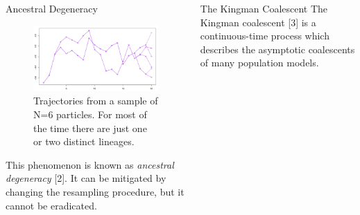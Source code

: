 \documentclass[final, 12pt]{beamer}
\newlength{\colwidth}
\begin{document}
\begin{frame}
\begin{columns}
\begin{column}{\colwidth}
\begin{block}{Ancestral Degeneracy}
\begin{figure} %
\includegraphics[width=0.9\colwidth]{degeneracy.pdf}
\caption{Trajectories from a sample of N=6 particles. For most of the time there are just one or two distinct lineages.}
\end{figure}

This phenomenon is known as \emph{ancestral degeneracy} [2]. It can be mitigated by changing the resampling procedure, but it cannot be eradicated.
\end{block}
\end{column}

\begin{column}{\colwidth}

\vspace*{-75pt}

\begin{block}{The Kingman Coalescent}
The Kingman coalescent [3] is a continuous-time process which describes the asymptotic coalescents of many population models.\\[10pt]


\end{block}
\end{column}
\end{columns}
\end{frame}
\end{document}
